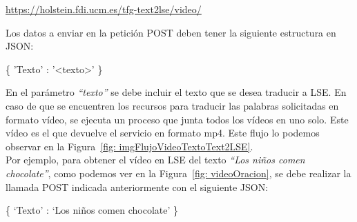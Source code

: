\begin{shaded}
	\url{https://holstein.fdi.ucm.es/tfg-text2lse/video/  }	
\end{shaded}


Los datos a enviar en la petición POST deben tener la siguiente estructura en JSON: 
\begin{center}

		\{ 'Texto' : '<texto>' \}

\end{center}


En el parámetro \textit{``texto''} se debe incluir el texto que se desea traducir a LSE. En caso de que se encuentren los recursos para traducir las palabras solicitadas en formato vídeo, se ejecuta un proceso que junta todos los vídeos en uno solo. Este vídeo es el que devuelve el servicio en formato mp4. Este flujo lo podemos observar en la Figura~\ref {fig: imgFlujoVideoTextoText2LSE}.\\

Por ejemplo, para obtener el vídeo en LSE del texto \textit{``Los niños comen chocolate''}, como podemos ver en la Figura~\ref {fig: videoOracion}, se debe realizar la llamada POST indicada anteriormente con el siguiente JSON:

\begin{center}
	
	\{ `Texto' : `Los niños comen chocolate' \}
	
\end{center}


